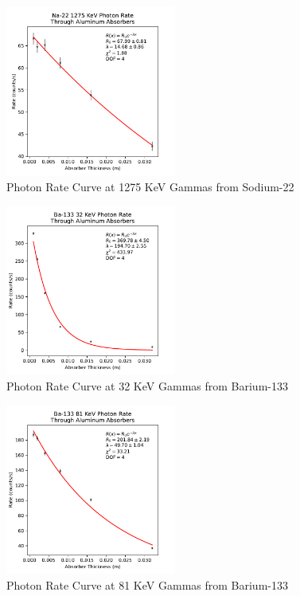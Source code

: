 \documentclass[12pt, letterpaper]{article}
\begin{document}
\begin{figure}[!htb]
    \centering
    \includegraphics[width=0.5\textwidth]{experiment1/figures/na22/rates-1275.pdf}
    \caption{Photon Rate Curve at 1275 KeV Gammas from Sodium-22}
    \label{fig:rates1275}
\end{figure}

\begin{figure}[!htb]
    \centering
    \includegraphics[width=0.5\textwidth]{experiment1/figures/ba133/rates-32.pdf}
    \caption{Photon Rate Curve at 32 KeV Gammas from Barium-133}
    \label{fig:rates32}
\end{figure}

\begin{figure}[!htb]
    \centering
    \includegraphics[width=0.5\textwidth]{experiment1/figures/ba133/rates-81.pdf}
    \caption{Photon Rate Curve at 81 KeV Gammas from Barium-133}
    \label{fig:rates81}
\end{figure}
\end{document}
